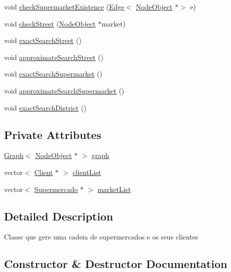 \begin{DoxyCompactItemize}
\item 
void \hyperlink{class_supermarket_manager_a23d192df8b8a56e317632845f9bb81d6}{check\+Supermarket\+Existence} (\hyperlink{class_edge}{Edge}$<$ \hyperlink{class_node_object}{Node\+Object} $\ast$$>$ e)
\item 
void \hyperlink{class_supermarket_manager_a7eca833133baf500e2a63b2ec9746b1d}{check\+Street} (\hyperlink{class_node_object}{Node\+Object} $\ast$market)
\item 
void \hyperlink{class_supermarket_manager_a7fa00d7adf078ca864908c901371a60c}{exact\+Search\+Street} ()
\item 
void \hyperlink{class_supermarket_manager_a0aa3fa8dab27db5f4960b840a2dd871c}{approximate\+Search\+Street} ()
\item 
void \hyperlink{class_supermarket_manager_a9841cd0c676abc1f128a68bb71bc2683}{exact\+Search\+Supermarket} ()
\item 
void \hyperlink{class_supermarket_manager_af797d69ada273a0582a619a0fc8f0638}{approximate\+Search\+Supermarket} ()
\item 
void \hyperlink{class_supermarket_manager_addbb66cfbe7d097687595c38e16b9c62}{exact\+Search\+District} ()
\end{DoxyCompactItemize}
\subsection*{Private Attributes}
\begin{DoxyCompactItemize}
\item 
\hyperlink{class_graph}{Graph}$<$ \hyperlink{class_node_object}{Node\+Object} $\ast$ $>$ \hyperlink{class_supermarket_manager_ab2cc638ffffc81beda833ca864e8bd62}{graph}
\item 
vector$<$ \hyperlink{class_client}{Client} $\ast$ $>$ \hyperlink{class_supermarket_manager_a48c5227a7d0ca5f8db9de726184e116a}{client\+List}
\item 
vector$<$ \hyperlink{class_supermercado}{Supermercado} $\ast$ $>$ \hyperlink{class_supermarket_manager_a122812406afbf7d0d130d39e6921d5f5}{market\+List}
\end{DoxyCompactItemize}


\subsection{Detailed Description}
Classe que gere uma cadeia de supermercados e os seus clientes 

\subsection{Constructor \& Destructor Documentation}
\mbox{\label{class_supermarket_manager_a32727a0b65ce19d2dddf66d586b0fa57}} 
